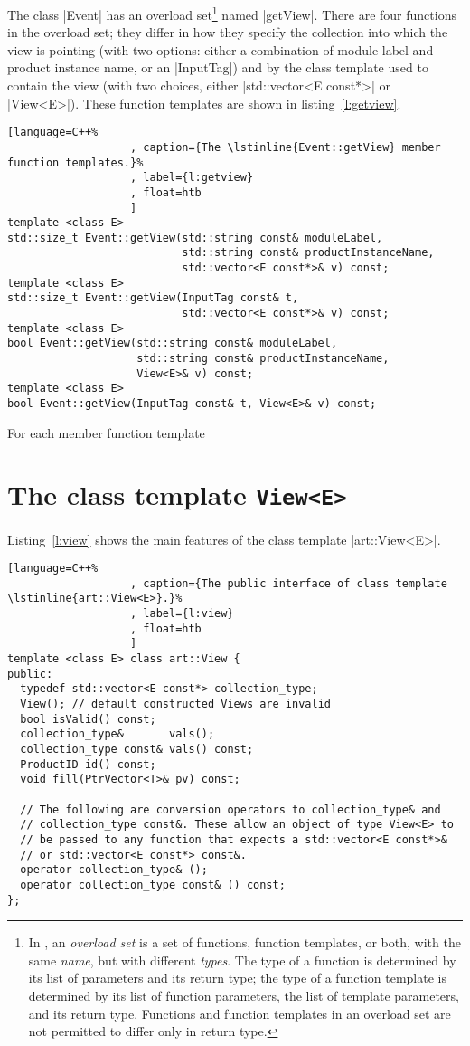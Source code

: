 \documentclass[screen]{memarticle}
\begin{document}
The class |Event| has an overload set\footnote{In \cpp, an
  \emph{overload set} is a set of functions, function templates, or
  both, with the same \emph{name}, but with different
  \emph{types}. The type of a function is determined by its list of
  parameters and its return type; the type of a function template is
  determined by its list of function parameters, the list of template
  parameters, and its return type. Functions and function templates in
  an overload set are not permitted to differ only in return type.}
named |getView|. There are four functions in the overload set; they
differ in how they specify the collection into which the view is
pointing (with two options: either a combination of module label and
product instance name, or an |InputTag|) and by the class template
used to contain the view (with two choices, either %
|std::vector<E const*>| or |View<E>|). These function templates are shown in
listing~\ref{l:getview}.
\begin{lstlisting}[language=C++%
                   , caption={The \lstinline{Event::getView} member function templates.}%
                   , label={l:getview}
                   , float=htb
                   ]
template <class E>
std::size_t Event::getView(std::string const& moduleLabel,
                           std::string const& productInstanceName,
                           std::vector<E const*>& v) const;
template <class E>
std::size_t Event::getView(InputTag const& t, 
                           std::vector<E const*>& v) const;
template <class E>
bool Event::getView(std::string const& moduleLabel,
                    std::string const& productInstanceName,
                    View<E>& v) const;
template <class E>
bool Event::getView(InputTag const& t, View<E>& v) const;
\end{lstlisting}

For each member function template

\chapter{The class template \lstinline{View<E>}\label{ch:view-template}}

Listing~\ref{l:view} shows the main features of the class template |art::View<E>|.

\begin{lstlisting}[language=C++%
                   , caption={The public interface of class template \lstinline{art::View<E>}.}%
                   , label={l:view}
                   , float=htb
                   ]
template <class E> class art::View {
public:
  typedef std::vector<E const*> collection_type;
  View(); // default constructed Views are invalid
  bool isValid() const;
  collection_type&       vals();
  collection_type const& vals() const;
  ProductID id() const;
  void fill(PtrVector<T>& pv) const;

  // The following are conversion operators to collection_type& and
  // collection_type const&. These allow an object of type View<E> to
  // be passed to any function that expects a std::vector<E const*>&
  // or std::vector<E const*> const&.
  operator collection_type& ();
  operator collection_type const& () const;
};
\end{lstlisting}
\end{document}
